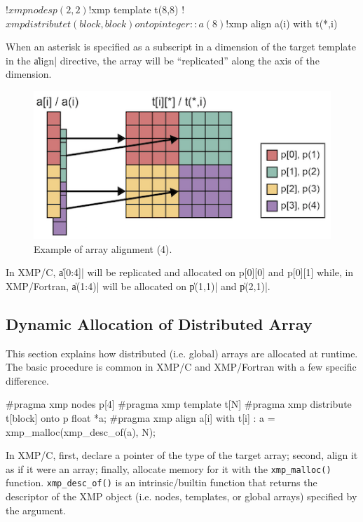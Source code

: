 \begin{XFexample}
!$xmp nodes p(2,2)
!$xmp template t(8,8)
!$xmp distribute t(block,block) onto p
integer :: a(8)
!$xmp align a(i) with t(*,i)
\end{XFexample}

When an asterisk is specified as a subscript in a dimension of the
target template in the \|align| directive, the array will be
``replicated'' along the axis of the dimension.

\begin{figure}
  \centering
  \includegraphics{figs/replicate.png}
  \caption{Example of array alignment (4).}
\end{figure}

In XMP/C, \|a[0:4]| will be replicated and allocated on p[0][0] and
p[0][1] while, in XMP/Fortran, \|a(1:4)| will be allocated on \|p(1,1)|
and \|p(2,1)|.


\subsection{Dynamic Allocation of Distributed Array}

This section explains how distributed (i.e. global) arrays are allocated
at runtime. The basic procedure is common in XMP/C and XMP/Fortran with
a few specific difference.


\begin{XCexample}
#pragma xmp nodes p[4]
#pragma xmp template t[N]
#pragma xmp distribute t[block] onto p
float *a;
#pragma xmp align a[i] with t[i]
  :
a = xmp_malloc(xmp_desc_of(a), N);
\end{XCexample}

In XMP/C, first, declare a pointer of the type of the target array; 
%
second, align it as if it were an array;
%
finally, allocate memory for it with the {\tt xmp\_malloc()}
function. {\tt xmp\_desc\_of()} is an 
intrinsic/builtin function that returns the descriptor of the XMP object
(i.e. nodes, templates, or global arrays) specified by the argument.

